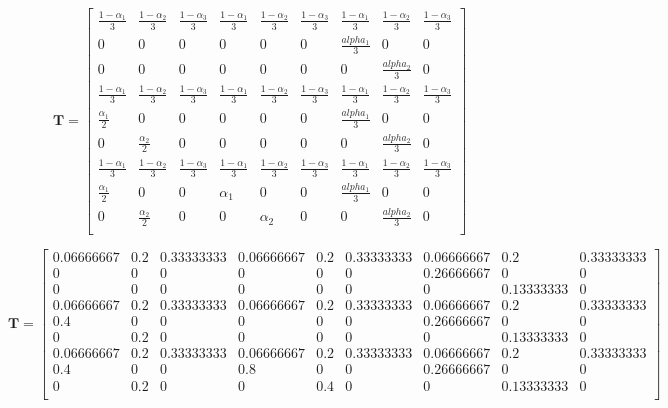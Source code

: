 \documentclass{article}
\begin{document}
\[\mathbf{T}=
\begin{bmatrix}
    \frac{1-\alpha_1}{3} &  \frac{1-\alpha_2}{3} & \frac{1-\alpha_3}{3} & \frac{1-\alpha_1}{3} &  \frac{1-\alpha_2}{3} & \frac{1-\alpha_3}{3} & \frac{1-\alpha_1}{3} &  \frac{1-\alpha_2}{3} & \frac{1-\alpha_3}{3} \\
    0 & 0 & 0 &  0 & 0 & 0 & \frac{alpha_1}{3}& 0 & 0 \\
    0 & 0 & 0 & 0 & 0 & 0 & 0 & \frac{alpha_2}{3} & 0 \\
        \frac{1-\alpha_1}{3} &  \frac{1-\alpha_2}{3} & \frac{1-\alpha_3}{3} & \frac{1-\alpha_1}{3} &  \frac{1-\alpha_2}{3} & \frac{1-\alpha_3}{3} & \frac{1-\alpha_1}{3} &  \frac{1-\alpha_2}{3} & \frac{1-\alpha_3}{3} \\
	    \frac{\alpha_1}{2} & 0 & 0 & 0 & 0 & 0 & \frac{alpha_1}{3} & 0 & 0 \\
	   0 & \frac{\alpha_2}{2} & 0 & 0 & 0 & 0 & 0 & \frac{alpha_2}{3} & 0 \\
        \frac{1-\alpha_1}{3} &  \frac{1-\alpha_2}{3} & \frac{1-\alpha_3}{3} & \frac{1-\alpha_1}{3} &  \frac{1-\alpha_2}{3} & \frac{1-\alpha_3}{3} & \frac{1-\alpha_1}{3} &  \frac{1-\alpha_2}{3} & \frac{1-\alpha_3}{3} \\
		   \frac{\alpha_1}{2} & 0 & 0 & \alpha_1 & 0 & 0 & \frac{alpha_1}{3} & 0 & 0 \\
		  0 & \frac{\alpha_2}{2} & 0 & 0 & \alpha_2 & 0 & 0 & \frac{alpha_2}{3} & 0 \\

\end{bmatrix}
\]


\[\mathbf{T}=
\begin{bmatrix}
    0.06666667 & 0.2 & 0.33333333 &  0.06666667 &  0.2 & 0.33333333 & 0.06666667 & 0.2 & 0.33333333 \\
    0 & 0 & 0 & 0 & 0 & 0 & 0.26666667 & 0 & 0 \\
    0 & 0 & 0 & 0 & 0 & 0 & 0 & 0.13333333 & 0 \\
       0.06666667 & 0.2 & 0.33333333 &  0.06666667 &  0.2 & 0.33333333 & 0.06666667 & 0.2 & 0.33333333 \\
	   0.4 & 0 & 0 & 0 & 0 & 0 & 0.26666667 & 0 & 0 \\
	   0 & 0.2 & 0 & 0 & 0 & 0 & 0 & 0.13333333 & 0 \\
       0.06666667 & 0.2 & 0.33333333 &  0.06666667 &  0.2 & 0.33333333 & 0.06666667 & 0.2 & 0.33333333 \\
		  0.4 & 0 & 0 & 0.8 & 0 & 0 & 0.26666667 & 0 & 0 \\
		  0 & 0.2 & 0 & 0 &0.4 & 0 & 0 & 0.13333333 & 0 \\

\end{bmatrix}
\]
\end{document}
